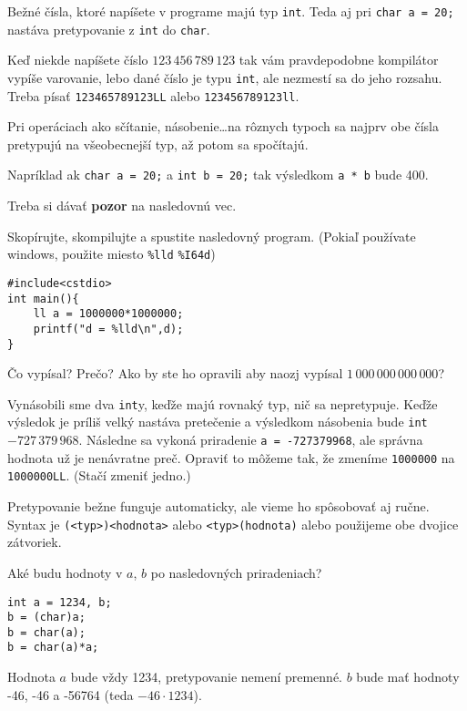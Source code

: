 \medskip

Bežné čísla, ktoré napíšete v programe majú typ \verb!int!.  Teda aj pri
\verb!char a = 20;! nastáva pretypovanie z \verb!int! do \verb!char!.

Keď niekde napíšete číslo $123\,456\,789\,123$ tak vám pravdepodobne kompilátor
vypíše varovanie, lebo dané číslo je typu \verb!int!, ale nezmestí sa do jeho
rozsahu. Treba písať \verb!123465789123LL! alebo \verb!123456789123ll!.

\medskip

Pri operáciach ako sčítanie, násobenie\dots na rôznych typoch sa najprv obe
čísla pretypujú na všeobecnejší typ, až potom sa spočítajú.

Napríklad ak \verb!char a = 20;! a \verb!int b = 20;! tak výsledkom \verb!a * b!
bude 400.

Treba si dávať \textbf{pozor} na nasledovnú vec.

\cvicenie Skopírujte, skompilujte a spustite nasledovný program.  (Pokiaľ
používate windows, použite miesto \verb!%lld! \verb!%I64d!)
\begin{lstlisting}
#include<cstdio>
int main(){
    ll a = 1000000*1000000;    
    printf("d = %lld\n",d);
}
\end{lstlisting}
Čo vypísal? Prečo? Ako by ste ho opravili aby naozj vypísal
$1\,000\,000\,000\,000$?

\riesenie Vynásobili sme dva \verb!int!y, keďže majú rovnaký typ, nič sa
nepretypuje.  Keďže výsledok je príliš velký nastáva pretečenie a výsledkom
násobenia bude \verb!int!  $-727\,379\,968$. Následne sa vykoná priradenie
\verb!a = -727379968!, ale správna hodnota už je nenávratne preč. Opraviť to
môžeme tak, že zmeníme \verb!1000000! na \verb!1000000LL!. (Stačí zmeniť
jedno.)

\medskip

Pretypovanie bežne funguje automaticky, ale vieme ho spôsobovať aj ručne.
Syntax je \verb!(<typ>)<hodnota>! alebo \verb!<typ>(hodnota)! alebo použijeme
obe dvojice zátvoriek.

\cvicenie Aké budu hodnoty v $a$, $b$ po nasledovných priradeniach? 
\begin{lstlisting}
int a = 1234, b;
b = (char)a;
b = char(a);
b = char(a)*a;
\end{lstlisting}

\riesenie Hodnota $a$ bude vždy 1234, pretypovanie nemení premenné. 
$b$ bude mať hodnoty -46, -46 a -56764 (teda $-46\cdot 1234$).

\medskip

